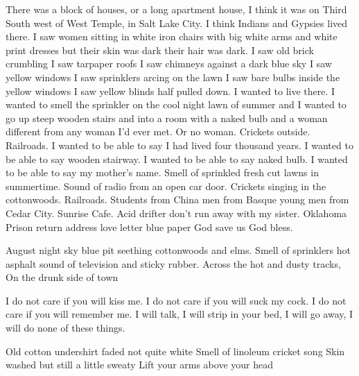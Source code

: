 \documentclass[english,11pt,letterpaper,onecolumn]{scrbook}
\begin{document}
\begin{poem}
\begin{stanza}
There was a block of houses, or a long apartment house, I think it was on Third South west of West Temple, in Salt Lake City.\verseline
I think Indians and Gypsies lived there.  I saw women sitting in white iron chairs with big white arms and white print dresses but their skin was dark their hair was dark.  I saw old brick crumbling I saw tarpaper roofs I saw chimneys against a dark blue sky I saw yellow windows I saw sprinklers arcing on the lawn I saw bare bulbs inside the yellow windows I saw yellow blinds half pulled down.  I wanted to live there.  I wanted to smell the sprinkler on the cool night lawn of summer and I wanted to go up steep wooden stairs and into a room with a naked bulb and a woman different from any woman I'd ever met.  Or no woman.  Crickets outside.  Railroads.\verseline
I wanted to be able to say I had lived four thousand years.  I wanted to be able to say wooden stairway.  I wanted to be able to say naked bulb.  I wanted to be able to say my mother's name.\verseline
Smell of sprinkled fresh cut lawns in summertime.\verseline
Sound of radio from an open car door.\verseline
Crickets singing in the cottonwoods.\verseline
Railroads.\verseline
Students from China men from Basque young men from Cedar City.\verseline
Sunrise Cafe.\verseline
Acid drifter don't run away with my sister.\verseline
Oklahoma Prison return address love letter blue paper God save us God bless.
\end{stanza}

\begin{stanza}
August night sky blue pit seething cottonwoods and elms.\verseline
Smell of sprinklers hot asphalt sound of television and sticky rubber.\verseline
Across the hot and dusty tracks,\verseline
On the drunk side of town
\end{stanza}

\begin{stanza}
I do not care if you will kiss me.\verseline
I do not care if you will suck my cock.\verseline
I do not care if you will remember me.\verseline
I will talk, I will strip in your bed, I will go away, I will do none of these things.
\end{stanza}

\begin{stanza}
Old cotton undershirt faded not quite white\verseline
Smell of linoleum cricket song\verseline
Skin washed but still a little sweaty\verseline
Lift your arms above your head
\end{stanza}


\end{poem}
\end{document}
